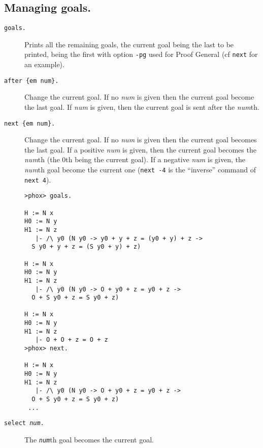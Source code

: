 
\subsection{Managing goals.}
\begin{description}
\item[{\tt goals.}]
  
  Prints all the remaining goals, the current goal being the last to be
  printed, being the first with option {\tt -pg} used for Proof General
  (cf {\tt next} for an example).

\item[{\tt after  \{em num\}.}]
Change  the current goal. If no {\em num} is given then the current goal
  become the last goal.  If  {\em num} is given, then the current
  goal is sent after  the {\em num}th.


\item[{\tt next \{em num\}.}]
  
  Change the current goal. If no {\em num} is given then the current goal
  becomes the last goal. If a positive {\em num} is given, then the current
  goal becomes the {\em num}th (the 0th being the current goal). If a negative
  {\em num} is given, the {\em num}th goal become the current one ({\tt next
    -4} is the ``inverse'' command of {\tt next 4}).

\begin{verbatim}
>phox> goals.

H := N x
H0 := N y
H1 := N z
   |- /\ y0 (N y0 -> y0 + y + z = (y0 + y) + z -> 
  S y0 + y + z = (S y0 + y) + z)

H := N x
H0 := N y
H1 := N z
   |- /\ y0 (N y0 -> O + y0 + z = y0 + z -> 
  O + S y0 + z = S y0 + z)

H := N x
H0 := N y
H1 := N z
   |- O + O + z = O + z
>phox> next.

H := N x
H0 := N y
H1 := N z
   |- /\ y0 (N y0 -> O + y0 + z = y0 + z -> 
  O + S y0 + z = S y0 + z)
 ...
\end{verbatim}

\item[{\tt select {\em num}.}]
The  {\tt\em num}th goal becomes the current goal.

\end{description}

